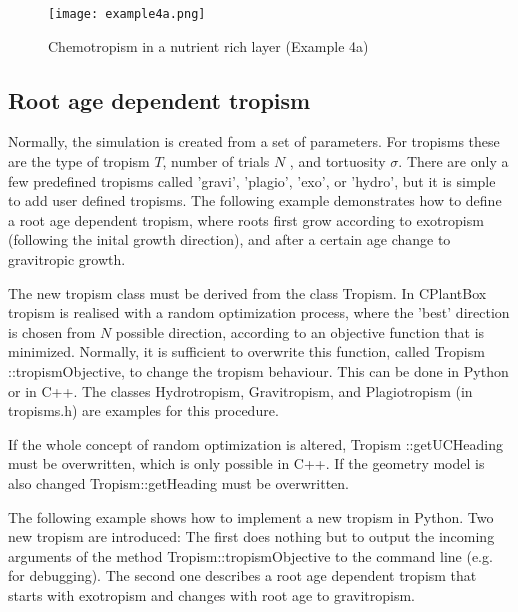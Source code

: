 \begin{figure}
\centering
\texttt{[image: example4a.png]}
\caption{Chemotropism in a nutrient rich layer (Example 4a)} \label{fig:chemo}
\end{figure}



\subsection{Root age dependent tropism} \label{sec:usertropism}

Normally, the simulation is created from a set of parameters. For tropisms these are the type of tropism $T$, number of trials $N$ , and tortuosity $\sigma$. There are only a few predefined tropisms called 'gravi', 'plagio', 'exo', or 'hydro', but it is simple to add user defined tropisms.
The following example demonstrates how to define a root age dependent tropism, where roots first grow according to exotropism (following the inital growth direction), and after a certain age change to gravitropic growth.

The new tropism class must be derived from the class Tropism. In CPlantBox tropism is realised with a random optimization process, where the 'best' direction is chosen from $N$ possible direction, according to an objective function that is minimized. Normally, it is sufficient to overwrite this function, called Tropism ::tropismObjective, to change the tropism behaviour. This can be done in Python or in C++. The classes Hydrotropism, Gravitropism, and Plagiotropism (in tropisms.h) are examples for this procedure.

If the whole concept of random optimization is altered, Tropism ::getUCHeading must be overwritten, which is only possible in C++. If the geometry model is also changed Tropism::getHeading must be overwritten.

The following example shows how to implement a new tropism in Python. Two new tropism are introduced:
The first does nothing but to output the incoming arguments of the method Tropism::tropismObjective to the command line (e.g. for debugging). The second one describes a root age dependent tropism that starts with exotropism and changes with root age to gravitropism.



